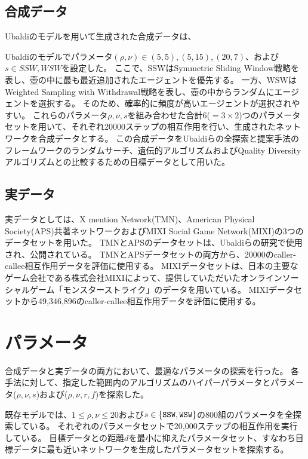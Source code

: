 \documentclass[uplatex,11pt,openany]{ujreport}
\begin{document}
        \subsection{合成データ}
            Ubaldiのモデルを用いて生成された合成データは、

            Ubaldiのモデルでパラメータ$(\rho,\nu)\in {(5,5),(5,15),(20,7)}$、および$s\in{SSW,WSW}$を設定した。
            ここで、SSWはSymmetric Sliding Window戦略を表し、壺の中に最も最近追加されたエージェントを優先する。
            一方、WSWはWeighted Sampling with Withdrawal戦略を表し、壺の中からランダムにエージェントを選択する。
            そのため、確率的に頻度が高いエージェントが選択されやすい。
            これらのパラメータ$\rho,\nu,s$を組み合わせた合計6($=3\times2$)つのパラメータセットを用いて、それぞれ20000ステップの相互作用を行い、生成されたネットワークを合成データとする。
            この合成データをUbaldiらの全探索と提案手法のフレームワークのランダムサーチ、遺伝的アルゴリズムおよびQuality Diversityアルゴリズムとの比較するための目標データとして用いた。

        \subsection{実データ}
            実データとしては、X mention Network(TMN)、American Physical Society(APS)共著ネットワークおよびMIXI Social Game Network(MIXI)の3つのデータセットを用いた。
            TMNとAPSのデータセットは、Ubaldiらの研究\cite{ubaldi_emergence_2021}で使用され、公開されている。
            TMNとAPSデータセットの両方から、20000のcaller-callee相互作用データを評価に使用する。
            MIXIデータセットは、日本の主要なゲーム会社である株式会社MIXIによって、提供していただいたオンラインソーシャルゲーム「モンスターストライク」のデータを用いている。
            MIXIデータセットから49,346,896のcaller-callee相互作用データを評価に使用する。

    \section{パラメータ}
        合成データと実データの両方において、最適なパラメータの探索を行った。
        各手法に対して、指定した範囲内のアルゴリズムのハイパーパラメータとパラメータ($\rho,\nu,s$)および($\rho,\nu,r,f$)を探索した。

        既存モデルでは、$1\leq \rho,\nu\leq20$および$s\in\{\verb|SSW|,\verb|WSW|\}$の800組のパラメータを全探索している。
        それぞれのパラメータセットで20,000ステップの相互作用を実行している。
        目標データとの距離$d$を最小に抑えたパラメータセット、すなわち目標データに最も近いネットワークを生成したパラメータセットを探索する。
\end{document}

